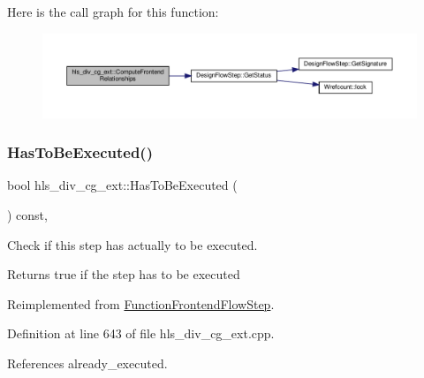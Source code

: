 Here is the call graph for this function\+:
\nopagebreak
\begin{figure}[H]
\begin{center}
\leavevmode
\includegraphics[width=350pt]{de/d52/classhls__div__cg__ext_a43c44d4fcf081c7084e6112bea0e68bc_cgraph}
\end{center}
\end{figure}
\mbox{\label{classhls__div__cg__ext_a9325b4922476e33095be75cbf2ec08f9}} 
\subsubsection{\texorpdfstring{Has\+To\+Be\+Executed()}{HasToBeExecuted()}}
{\footnotesize\ttfamily bool hls\+\_\+div\+\_\+cg\+\_\+ext\+::\+Has\+To\+Be\+Executed (\begin{DoxyParamCaption}{ }\end{DoxyParamCaption}) const\hspace{0.3cm}{\ttfamily [override]}, {\ttfamily [virtual]}}



Check if this step has actually to be executed. 

\begin{DoxyReturn}{Returns}
true if the step has to be executed 
\end{DoxyReturn}


Reimplemented from \hyperlink{classFunctionFrontendFlowStep_a12e786363530aa9533e4bd9380130d75}{Function\+Frontend\+Flow\+Step}.



Definition at line 643 of file hls\+\_\+div\+\_\+cg\+\_\+ext.\+cpp.



References already\+\_\+executed.

\mbox{\label{classhls__div__cg__ext_a68ca8c0cd178e82f30fd07b8e471604d}} 
